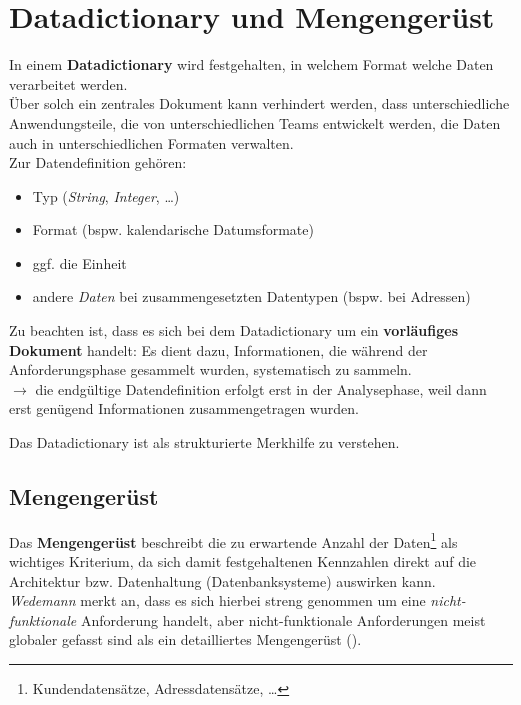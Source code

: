 \section{Datadictionary und Mengengerüst}
In einem \textbf{Datadictionary} wird festgehalten, in welchem Format welche Daten verarbeitet werden.\\

\noindent
Über solch ein zentrales Dokument kann verhindert werden, dass unterschiedliche Anwendungsteile, die von unterschiedlichen Teams entwickelt werden, die Daten auch in unterschiedlichen Formaten verwalten.\\

\noindent
Zur Datendefinition gehören:

\begin{itemize}
    \item Typ (\textit{String}, \textit{Integer}, \ldots)
    \item Format (bspw. kalendarische Datumsformate)
    \item ggf. die Einheit
    \item andere \textit{Daten} bei zusammengesetzten Datentypen (bspw. bei Adressen)
\end{itemize}

\noindent
Zu beachten ist, dass es sich bei dem Datadictionary um ein \textbf{vorläufiges Dokument} handelt: Es dient dazu, Informationen, die während der Anforderungsphase gesammelt wurden, systematisch zu sammeln.\\
$\rightarrow$ die endgültige Datendefinition erfolgt erst in der Analysephase, weil dann erst genügend Informationen zusammengetragen wurden.

\vspace{5mm}
\begin{tcolorbox}
    Das Datadictionary ist als strukturierte Merkhilfe zu verstehen.
\end{tcolorbox}
\vspace{5mm}

\subsection{Mengengerüst}
Das \textbf{Mengengerüst} beschreibt die zu erwartende Anzahl der Daten\footnote{Kundendatensätze, Adressdatensätze, \ldots} als wichtiges Kriterium, da sich damit festgehaltenen Kennzahlen direkt auf die Architektur bzw. Datenhaltung (Datenbanksysteme) auswirken kann.\\

\noindent
\textit{Wedemann} merkt an, dass es sich hierbei streng genommen um eine \textit{nicht-funktionale} Anforderung handelt, aber nicht-funktionale Anforderungen meist globaler gefasst sind als ein detailliertes Mengengerüst (\cite[76]{Wed09}).